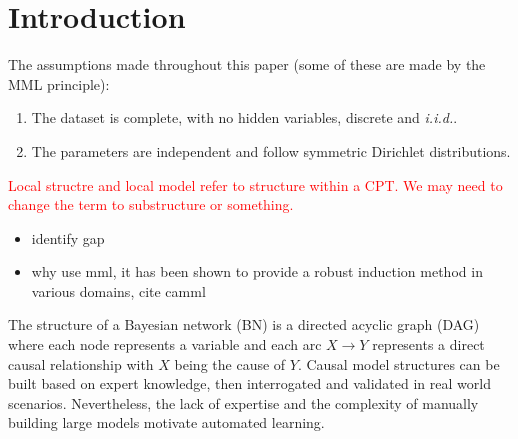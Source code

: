 \begin{abstract}
\label{sec:abst}
 

\end{abstract}

\section{Introduction}
\label{sec:intro}
The assumptions made throughout this paper (some of these are made by the MML principle):
\begin{enumerate}
\item The dataset is complete, with no hidden variables, discrete and \textit{i.i.d.}. 
\item The parameters are independent and follow symmetric Dirichlet distributions. 
\end{enumerate}
\textcolor{red}{Local structre and local model refer to structure within a CPT. We may need to change the term to substructure or something.}
\iffalse
\begin{itemize}
\item identify gap
\item why use mml, it has been shown to provide a robust induction method in various domains, cite camml
\end{itemize}

The structure of a Bayesian network (BN) is a directed acyclic graph (DAG) where each node represents a variable and each arc $X \to Y$ represents a direct causal relationship with $X$ being the cause of $Y$. Causal model structures can be built based on expert knowledge, then interrogated and validated in real world scenarios. Nevertheless, the lack of expertise and the complexity of manually building large models motivate automated learning. 

